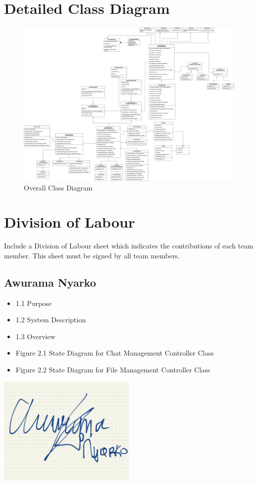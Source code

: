 \documentclass[]{article}
\begin{document}


\section{Detailed Class Diagram}
\label{sec:detailed_class_diagram}
\renewcommand{\thefigure}{4.\arabic{figure}}
\setcounter{figure}{0}
\begin{figure}
    \centering
    \includegraphics[scale=0.18]{class-diagram.jpg}
    \caption{Overall Class Diagram}
    \label{fig:class-diagram}
\end{figure}



\appendix
\section{Division of Labour}
\label{sec:division_of_labour}
Include a Division of Labour sheet which indicates the contributions of each team member. This sheet must be signed by all team members.
\subsection{Awurama Nyarko}
\label{subsec:awurama_nyarko}
\begin{itemize}
	\item 1.1 Purpose
	\item 1.2 System Description
	\item 1.3 Overview
 	\item Figure 2.1 State Diagram for Chat Management Controller Class
  	\item Figure 2.2 State Diagram for File Management Controller Class
\end{itemize}
\includegraphics[width=0.5\textwidth]{awurama.jpg}
\end{document}
